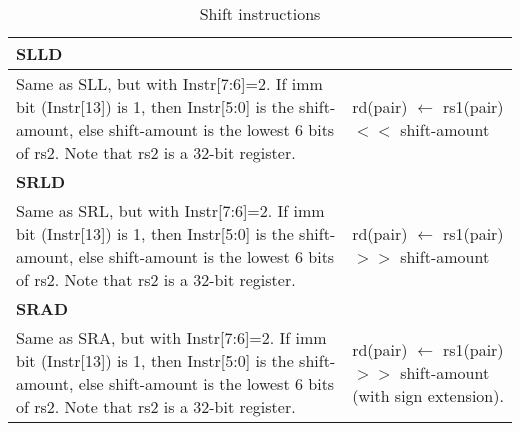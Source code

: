 \begin{table}[p]
  \centering
  \begin{tabular}[p]{|p{}|p{}|}
    \hline
\multicolumn{2}{|l|}{	\textbf{SLLD}} \\ 
 \hline 
    Same as SLL, but with Instr[7:6]=2.
    If imm bit (Instr[13]) is 1, then Instr[5:0] is the shift-amount,
    else shift-amount is the lowest 6 bits of rs2. Note that rs2
    is a 32-bit register. & 
    rd(pair) $\leftarrow$  rs1(pair) $<<$ shift-amount\\
\hline
\hline
\multicolumn{2}{|l|}{	\textbf{SRLD}} \\ 
 \hline 
    Same as SRL, but with Instr[7:6]=2.
    If imm bit (Instr[13]) is 1, then Instr[5:0] is the shift-amount,
    else shift-amount is the lowest 6 bits of rs2. Note that rs2
    is a 32-bit register. & 
    rd(pair) $\leftarrow$  rs1(pair) $>>$ shift-amount\\
\hline
\hline
\multicolumn{2}{|l|}{	\textbf{SRAD}} \\ 
 \hline 
    Same as SRA, but with Instr[7:6]=2.
    If imm bit (Instr[13]) is 1, then Instr[5:0] is the shift-amount,
    else shift-amount is the lowest 6 bits of rs2. Note that rs2
    is a 32-bit register. & 
    rd(pair) $\leftarrow$  rs1(pair) $>>$ shift-amount (with sign extension).\\
\hline
  \end{tabular}
  \caption{Shift instructions}
  \label{tab:shift:insns}
\end{table}

